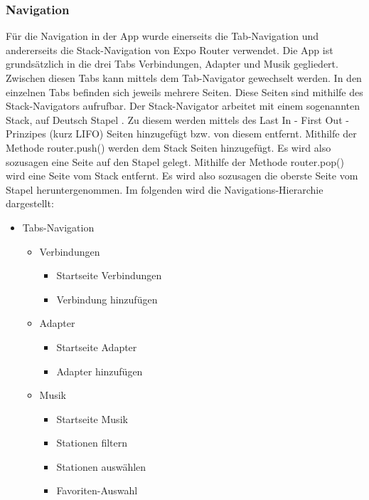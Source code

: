 \documentclass[11pt, twoside]{article}
\begin{document}
\subsubsection{Navigation}
Für die Navigation in der App wurde einerseits die Tab-Navigation und andererseits die Stack-Navigation von Expo Router verwendet. Die App ist grundsätzlich in die drei Tabs Verbindungen, Adapter und Musik gegliedert. Zwischen diesen Tabs kann mittels dem Tab-Navigator gewechselt werden. In den einzelnen Tabs befinden sich jeweils mehrere Seiten. Diese Seiten sind mithilfe des Stack-Navigators aufrufbar. Der Stack-Navigator arbeitet mit einem sogenannten Stack, auf Deutsch \glqq Stapel \grqq{}. Zu diesem werden mittels des Last In - First Out - Prinzipes (kurz LIFO) Seiten hinzugefügt bzw. von diesem entfernt. Mithilfe der Methode router.push() werden dem Stack Seiten hinzugefügt. Es wird also sozusagen eine Seite auf den Stapel gelegt. Mithilfe der Methode router.pop() wird eine Seite vom Stack entfernt. Es wird also sozusagen die oberste Seite vom Stapel heruntergenommen. Im folgenden wird die Navigations-Hierarchie dargestellt:
\begin{itemize}[label=-]
\item Tabs-Navigation
\begin{itemize}[label=-]
\item Verbindungen
\begin{itemize}[label=-]
\item Startseite Verbindungen
\item Verbindung hinzufügen
\end{itemize}
\item Adapter
\begin{itemize}[label=-]
\item Startseite Adapter
\item Adapter hinzufügen
\end{itemize}
\item Musik
\begin{itemize}[label=-]
\item Startseite Musik
\item Stationen filtern
\item Stationen auswählen
\item Favoriten-Auswahl
\end{itemize}
\end{itemize}
\end{itemize}
\end{document}
